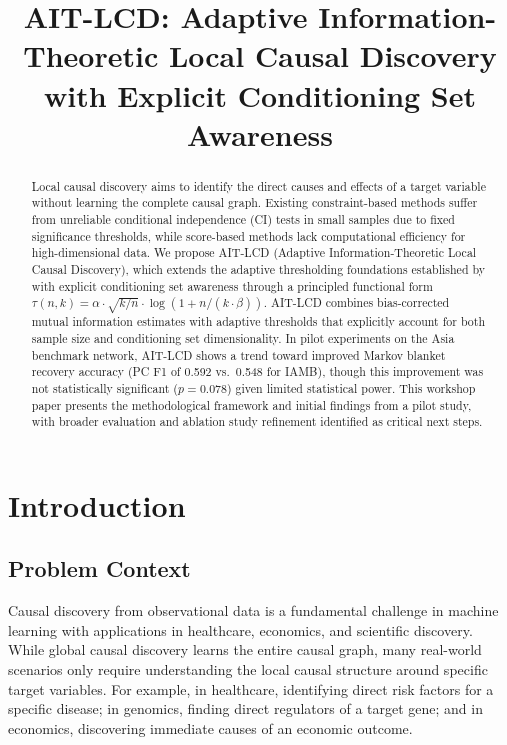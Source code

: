 \documentclass{article}
\title{AIT-LCD: Adaptive Information-Theoretic Local Causal Discovery\\with Explicit Conditioning Set Awareness}
\author{}
\theoremstyle{plain}
\theoremstyle{definition}
\begin{document}
\maketitle

\begin{abstract}
Local causal discovery aims to identify the direct causes and effects of a target variable without learning the complete causal graph. Existing constraint-based methods suffer from unreliable conditional independence (CI) tests in small samples due to fixed significance thresholds, while score-based methods lack computational efficiency for high-dimensional data. We propose AIT-LCD (Adaptive Information-Theoretic Local Causal Discovery), which extends the adaptive thresholding foundations established by \citet{lerner2013adaptive} with explicit conditioning set awareness through a principled functional form $\tau(n,k) = \alpha \cdot \sqrt{k/n} \cdot \log(1 + n/(k \cdot \beta))$. AIT-LCD combines bias-corrected mutual information estimates with adaptive thresholds that explicitly account for both sample size and conditioning set dimensionality. In pilot experiments on the Asia benchmark network, AIT-LCD shows a trend toward improved Markov blanket recovery accuracy (PC F1 of 0.592 vs.~0.548 for IAMB), though this improvement was not statistically significant ($p = 0.078$) given limited statistical power. This workshop paper presents the methodological framework and initial findings from a pilot study, with broader evaluation and ablation study refinement identified as critical next steps.
\end{abstract}

\section{Introduction}\label{sec:intro}

\subsection{Problem Context}

Causal discovery from observational data is a fundamental challenge in machine learning with applications in healthcare, economics, and scientific discovery. While global causal discovery learns the entire causal graph, many real-world scenarios only require understanding the local causal structure around specific target variables. For example, in healthcare, identifying direct risk factors for a specific disease; in genomics, finding direct regulators of a target gene; and in economics, discovering immediate causes of an economic outcome.
\end{document}
